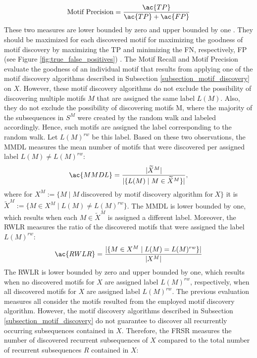\begin{equation}
\text{Motif Precision} = \frac{\ac{TP}}{\ac{TP} + \ac{FP}}
\label{eq:motif_precision}
\end{equation}
These two measures are lower bounded by zero and upper bounded by one \cite{Recall_Precision}. They should be maximized for each discovered motif for maximizing the goodness of motif discovery by maximizing the \ac{TP} and minimizing the \ac{FN}, respectively, \ac{FP} (see Figure \ref{fig:true_false_positives}) \cite{Recall_Precision}. \newline
The Motif Recall and Motif Precision evaluate the goodness of an individual motif that results from applying one of the motif discovery algorithms described in Subsection \ref{subsection_motif_discovery} on $X$. However, these motif discovery algorithms do not exclude the possibility of discovering multiple motifs $M$ that are assigned the same label $L(M)$. Also, they do not exclude the possibility of discovering motifs M, where the majority of the subsequences in $S^M$ were created by the random walk and labeled accordingly. Hence, such motifs are assigned the label corresponding to the random walk. Let $L(M)^{rw}$ be this label. Based on these two observations, the \ac{MMDL} measures the mean number of motifs that were discovered per assigned label $L(M) \neq L(M)^{rw}$:
\begin{equation}
\ac{MMDL} = \frac{|\widetilde{X}^M|}{|\{L(M) \mid M \in \widetilde{X}^M\}|},
\label{eq:mmdl}
\end{equation}
where for $X^M := \{M \mid M \ \text{discovered by motif discovery algorithm for} \ X\}$ it is $\widetilde{X}^{M} := \{M \in X^M \mid L(M) \neq L(M)^{rw}\}$. The \ac{MMDL} is lower bounded by one, which results when each $M \in \widetilde{X}^{M}$ is assigned a different label. \newline
Moreover, the \ac{RWLR} measures the ratio of the discovered motifs that were assigned the label $L(M)^{rw}$:
\begin{equation}
\ac{RWLR} = \frac{|\{M \in X^M \mid L(M) = L(M)^{rw} \}|}{|X^M|}
\label{eq:rwlr}
\end{equation}
The \ac{RWLR} is lower bounded by zero and upper bounded by one, which results when no discovered motifs for $X$ are assigned label $L(M)^{rw}$, respectively, when all discovered motifs for $X$ are assigned label $L(M)^{rw}$. \newline 
The previous evaluation measures all consider the motifs resulted from the employed motif discovery algorithm. However, the motif discovery algorithms described in Subsection \ref{subsection_motif_discovery} do not guarantee to discover all recurrently occurring subsequences contained in $X$. Therefore, the \ac{FRSR} measures the number of discovered recurrent subsequences of $X$ compared to the total number of recurrent subsequences $R$ contained in $X$: 

